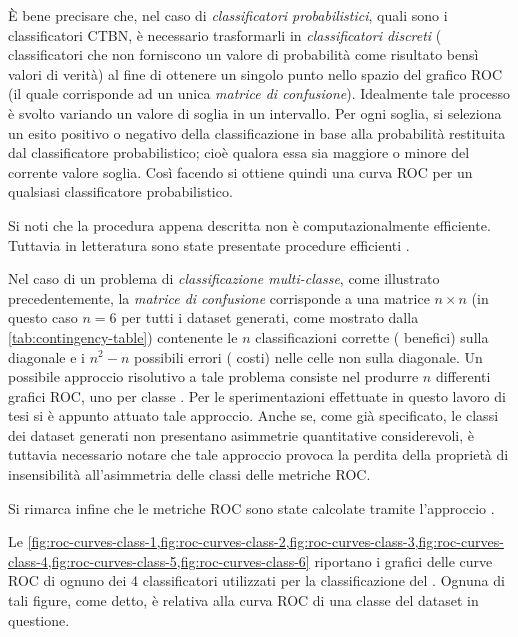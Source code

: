 \`E bene precisare che, nel caso di \emph{classificatori probabilistici}, quali sono i classificatori \acs{CTBN}, è necessario trasformarli in \emph{classificatori discreti} (\ie{} classificatori che non forniscono un valore di probabilità come risultato bensì valori di verità) al fine di ottenere un singolo punto nello spazio del grafico \acs{ROC} (il quale corrisponde ad un unica \emph{matrice di confusione}). Idealmente tale processo è svolto variando un valore di soglia in un intervallo. Per ogni soglia, si seleziona un esito positivo o negativo della classificazione in base alla probabilità restituita dal classificatore probabilistico; cioè qualora essa sia maggiore o minore del corrente valore soglia. Così facendo si ottiene quindi una curva \acs{ROC} per un qualsiasi classificatore probabilistico.

Si noti che la procedura appena descritta non è computazionalmente efficiente. Tuttavia in letteratura sono state presentate procedure efficienti \citep[si veda][sezione $5$]{Fawcett2006}.

Nel caso di un problema di \emph{classificazione multi-classe}, come illustrato precedentemente, la \emph{matrice di confusione} corrisponde a una matrice $n \times n$ (in questo caso $n=6$ per tutti i dataset generati, come mostrato dalla \vref{tab:contingency-table}) contenente le $n$ classificazioni corrette (\ie{} benefici) sulla diagonale e i $n^2 - n$ possibili errori (\ie{} costi) nelle celle non sulla diagonale. Un possibile approccio risolutivo a tale problema consiste nel produrre $n$ differenti grafici \acs{ROC}, uno per classe \citep{Fawcett2006}. Per le sperimentazioni effettuate in questo lavoro di tesi si è appunto attuato tale approccio. Anche se, come già specificato, le classi dei dataset generati non presentano asimmetrie quantitative considerevoli, è tuttavia necessario notare che tale approccio provoca la perdita della proprietà di insensibilità all'asimmetria delle classi delle metriche \acs{ROC}.

Si rimarca infine che le metriche \acs{ROC} sono state calcolate tramite l'approccio \emph{}.

Le \vref{fig:roc-curves-class-1,fig:roc-curves-class-2,fig:roc-curves-class-3,fig:roc-curves-class-4,fig:roc-curves-class-5,fig:roc-curves-class-6} riportano i grafici delle curve \acs{ROC} di ognuno dei $4$ classificatori utilizzati per la classificazione del . Ognuna di tali figure, come detto, è relativa alla curva \acs{ROC} di una classe del dataset in questione.

